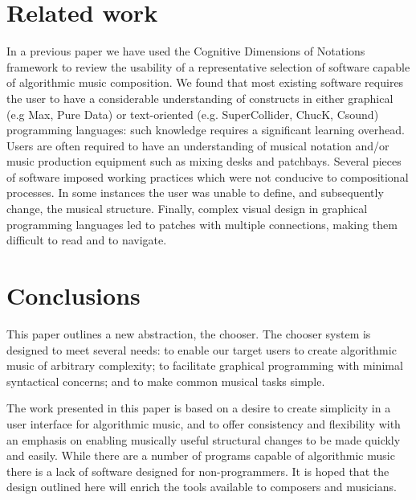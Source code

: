 \documentclass[runningheads,a4paper]{llncs}
\begin{document}





\section{Related work}

In a previous paper \cite{Bellingham} we have used the Cognitive Dimensions of Notations framework \cite{Green} to review the usability of a representative selection of software capable of algorithmic music composition. We found that most existing software requires the user to have a considerable understanding of constructs in either graphical (e.g Max, Pure Data) or text-oriented (e.g. SuperCollider, ChucK, Csound) programming languages: such knowledge requires a significant learning overhead. Users are often required to have an understanding of musical notation and/or music production equipment such as mixing desks and patchbays. Several pieces of software imposed working practices which were not conducive to compositional processes. In some instances the user was unable to define, and subsequently change, the musical structure. Finally, complex visual design in graphical programming languages led to patches with multiple connections, making them difficult to read and to navigate. 



\section{Conclusions}\label{emergent-design-principles}

This paper outlines a new abstraction, the chooser. The chooser system is designed to meet several needs: to enable our target users to create algorithmic music of arbitrary complexity; to facilitate graphical programming with minimal syntactical concerns; and to make common musical tasks simple. 

The work presented in this paper is based on a desire to create simplicity in a user interface for algorithmic music, and to offer consistency and flexibility with an emphasis on enabling musically useful structural changes to be made quickly and easily. While there are a number of programs capable of algorithmic music there is a lack of software designed for non-programmers. It is hoped that the design outlined here will enrich the tools available to composers and musicians.
\end{document}
